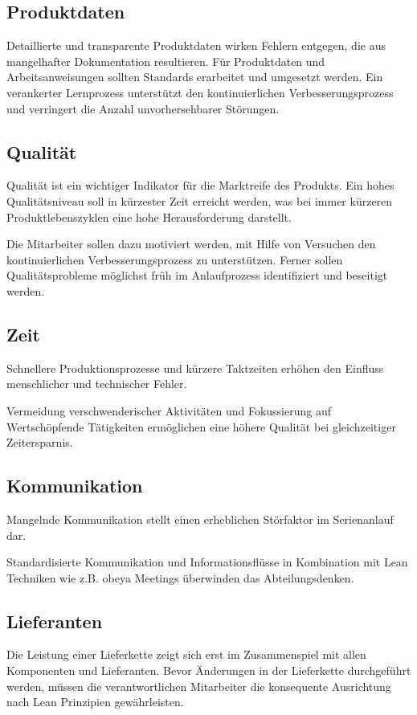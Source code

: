 \subsection*{Produktdaten}
Detaillierte und transparente Produktdaten wirken Fehlern entgegen, die aus mangelhafter Dokumentation resultieren. 
Für Produktdaten und Arbeitsanweisungen sollten Standards erarbeitet und umgesetzt werden. Ein verankerter Lernprozess unterstützt den kontinuierlichen Verbesserungsprozess und verringert die Anzahl unvorhersehbarer Störungen. 


\subsection*{Qualität}
Qualität ist ein wichtiger Indikator für die Marktreife des Produkts. Ein hohes Qualitätsniveau soll in kürzester Zeit erreicht werden, was bei immer kürzeren Produktlebenszyklen eine hohe Herausforderung darstellt. 

Die Mitarbeiter sollen dazu motiviert werden, mit Hilfe von Versuchen den kontinuierlichen Verbesserungsprozess zu unterstützen. Ferner sollen Qualitätsprobleme möglichst früh im Anlaufprozess identifiziert und beseitigt werden. 

\subsection*{Zeit}
Schnellere Produktionsprozesse und kürzere Taktzeiten erhöhen den Einfluss menschlicher und technischer Fehler. 

Vermeidung verschwenderischer Aktivitäten und Fokussierung auf Wertschöpfende Tätigkeiten ermöglichen eine höhere Qualität bei gleichzeitiger Zeitersparnis. 

\subsection*{Kommunikation}
Mangelnde Kommunikation stellt einen erheblichen Störfaktor im Serienanlauf dar. 

Standardisierte Kommunikation und Informationsflüsse in Kombination mit Lean Techniken wie z.B. \gls{obeya} Meetings überwinden das Abteilungsdenken. 

\subsection*{Lieferanten}
Die Leistung einer Lieferkette zeigt sich erst im Zusammenspiel mit allen Komponenten und Lieferanten. 
Bevor Änderungen in der Lieferkette durchgeführt werden, müssen die verantwortlichen Mitarbeiter die konsequente Ausrichtung nach Lean Prinzipien gewährleisten. 

